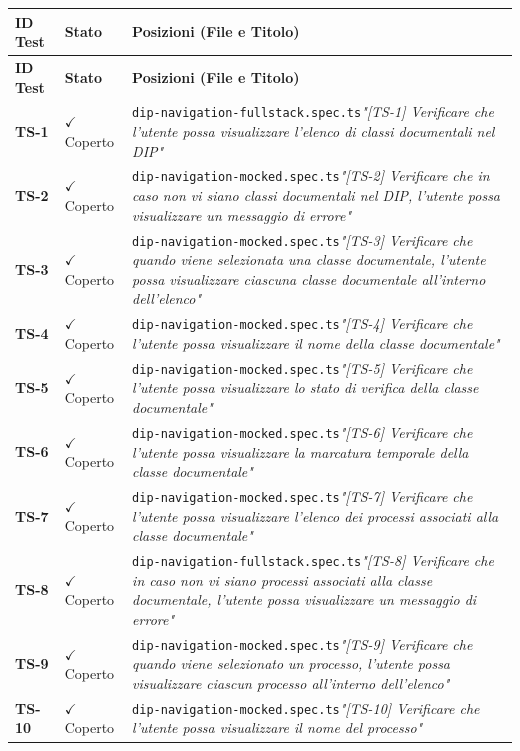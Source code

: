 \documentclass[a4paper,12pt]{article}
\newcommand{\ok}{\textcolor{green!60!black}{$\checkmark$ Coperto}}
\newcommand{\f}[1]{\nolinkurl{#1}\newline}
\newcommand{\q}[1]{\textit{#1}}
\begin{document}
\setlength{\LTleft}{-0.4cm}
\renewcommand{\arraystretch}{1.2}
\begin{longtable}{|p{1.5cm}|p{3.0cm}|p{10.5cm}|}
\hline
\rowcolor{zpusgreen!30}
\textbf{ID Test} & \textbf{Stato} & \textbf{Posizioni (File e Titolo)} \\
\hline
\endfirsthead
\rowcolor{zpusgreen!30}
\textbf{ID Test} & \textbf{Stato} & \textbf{Posizioni (File e Titolo)} \\
\hline
\endhead

\textbf{TS-1} & \ok & \f{dip-navigation-fullstack.spec.ts}\q{"[TS-1] Verificare che l'utente possa visualizzare l'elenco di classi documentali nel DIP"} \\ \hline
\textbf{TS-2} & \ok & \f{dip-navigation-mocked.spec.ts}\q{"[TS-2] Verificare che in caso non vi siano classi documentali nel DIP, l'utente possa visualizzare un messaggio di errore"} \\ \hline
\textbf{TS-3} & \ok & \f{dip-navigation-mocked.spec.ts}\q{"[TS-3] Verificare che quando viene selezionata una classe documentale, l'utente possa visualizzare ciascuna classe documentale all'interno dell'elenco"} \\ \hline
\textbf{TS-4} & \ok & \f{dip-navigation-mocked.spec.ts}\q{"[TS-4] Verificare che l'utente possa visualizzare il nome della classe documentale"} \\ \hline
\textbf{TS-5} & \ok & \f{dip-navigation-mocked.spec.ts}\q{"[TS-5] Verificare che l'utente possa visualizzare lo stato di verifica della classe documentale"} \\ \hline
\textbf{TS-6} & \ok & \f{dip-navigation-mocked.spec.ts}\q{"[TS-6] Verificare che l'utente possa visualizzare la marcatura temporale della classe documentale"} \\ \hline
\textbf{TS-7} & \ok & \f{dip-navigation-mocked.spec.ts}\q{"[TS-7] Verificare che l'utente possa visualizzare l'elenco dei processi associati alla classe documentale"} \\ \hline
\textbf{TS-8} & \ok & \f{dip-navigation-fullstack.spec.ts}\q{"[TS-8] Verificare che in caso non vi siano processi associati alla classe documentale, l'utente possa visualizzare un messaggio di errore"} \\ \hline
\textbf{TS-9} & \ok & \f{dip-navigation-mocked.spec.ts}\q{"[TS-9] Verificare che quando viene selezionato un processo, l'utente possa visualizzare ciascun processo all'interno dell'elenco"} \\ \hline
\textbf{TS-10} & \ok & \f{dip-navigation-mocked.spec.ts}\q{"[TS-10] Verificare che l'utente possa visualizzare il nome del processo"} \\ \hline

\end{longtable}
\end{document}
